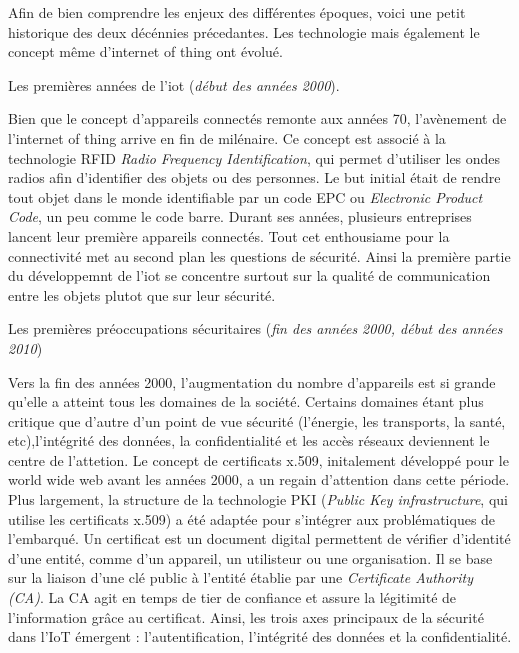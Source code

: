 \vspace{0.1cm}

Afin de bien comprendre les enjeux des différentes époques, voici une petit historique des deux décénnies précedantes. Les technologie mais également le concept même d'internet of thing ont évolué.

\vspace{0.1cm}

Les premières années de l'iot (\textit{début des années 2000}).

Bien que le concept d'appareils connectés remonte aux années 70, l'avènement de l'internet of thing arrive en fin de milénaire. Ce concept est associé à la technologie RFID \textit{Radio Frequency Identification}\cite{RFID}, qui permet d'utiliser les ondes radios afin d'identifier des objets ou des personnes. Le but initial était de rendre tout objet dans le monde identifiable par un code EPC ou \textit{Electronic Product Code}\cite{EPC}, un peu comme le code barre. Durant ses années, plusieurs entreprises lancent leur première appareils connectés. Tout cet enthousiame pour la connectivité met au second plan les questions de sécurité. Ainsi la première partie du développemnt de l'iot se concentre surtout sur la qualité de communication entre les objets plutot que sur leur sécurité.

\vspace{0.1cm}

Les premières préoccupations sécuritaires (\textit{fin des années 2000, début des années 2010})

Vers la fin des années 2000, l'augmentation du nombre d'appareils est si grande qu'elle a atteint tous les domaines de la société. Certains domaines étant plus critique que d'autre d'un point de vue sécurité (l'énergie, les transports, la santé, etc),l'intégrité des données, la confidentialité et les accès réseaux deviennent le centre de l'attetion. 
Le concept de certificats x.509, initalement développé pour le world wide web avant les années 2000, a un regain d'attention dans cette période. Plus largement, la structure de la technologie PKI (\textit{Public Key infrastructure}, qui utilise les certificats x.509)\cite{PKI} a été adaptée pour s'intégrer aux problématiques de l'embarqué. Un certificat est un document digital permettent de vérifier d'identité d'une entité, comme d'un appareil, un utilisteur ou une organisation. Il se base sur la liaison d'une clé public à l'entité établie par une \textit{Certificate Authority (CA)}. La CA agit en temps de tier de confiance et assure la légitimité de l'information grâce au certificat. Ainsi, les trois axes principaux de la sécurité dans l'IoT émergent : l'autentification, l'intégrité des données et la confidentialité.

